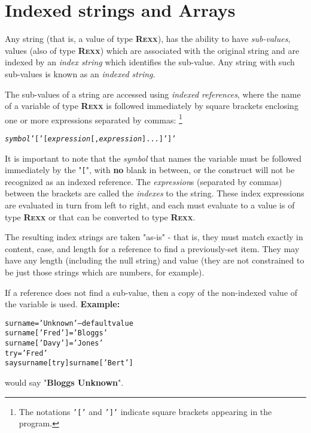 \chapter{Indexed strings and Arrays}\label{refinstr}
 
Any \nr{} string (that is, a value of type \textbf{R\textsc{exx}}), has the
ability to have \emph{sub-values}, values (also of type \textbf{R\textsc{exx}})
which are associated with the original string and are indexed by an
\emph{index string} which identifies the sub-value.
Any string with such sub-values is known as an \emph{indexed string}.
 
The sub-values of a \nr{} string are accessed using \emph{indexed
references}, where the name of a variable of type \textbf{R\textsc{exx}} is
followed immediately by square brackets enclosing one or more
expressions separated by commas:
\footnote{
The notations \texttt{'['} and \texttt{']'}
indicate square brackets appearing in the \nr{} program.
}
\begin{shaded}
\begin{alltt}
\emph{symbol}'['[\emph{expression}[, \emph{expression}]...]']'
\end{alltt}
\end{shaded}
It is important to note that the \emph{symbol} that names the
variable must be followed immediately by the "\texttt{[}",
with \textbf{no} blank in between, or the construct will not be
recognized as an indexed reference.
 The \emph{expression}s (separated by commas) between the
brackets are called the \emph{indexes} to the string.
These index expressions are evaluated in turn from left to right, and
each must evaluate to a value is of type \textbf{R\textsc{exx}} or that can be
converted to type \textbf{R\textsc{exx}}.
 
The resulting index strings are taken "as-is" - that is, they
must match exactly in content, case, and length for a reference to find
a previously-set item.
They may have any length (including the null string) and value (they are
not constrained to be just those strings which are numbers, for
example).
 
If a reference does not find a sub-value, then a copy of the non-indexed
value of the variable is used.
 \textbf{Example:}
\begin{alltt}
surname='Unknown'         -- default value
surname['Fred']='Bloggs'
surname['Davy']='Jones'
try='Fred'
say surname[try] surname['Bert']
\end{alltt}
would say "\textbf{Bloggs Unknown}".
 
